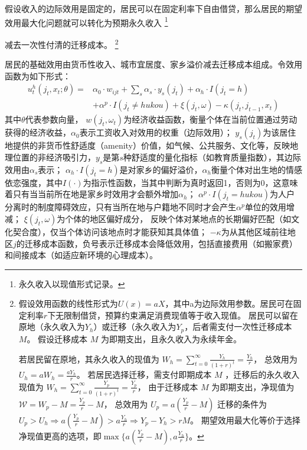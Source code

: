 \documentclass[
  a4paper,
  zihao=-4,
  fontset=mac,
  AutoFakeBold,
  AutoFakeSlant,
  oneside]{ctexbook}
\let\oldfootnote\footnote
\renewcommand{\footnote}[1]{%
  \oldfootnote{\setstretch{1.5}#1}%
}
\begin{document}
假设收入的边际效用是固定的，居民可以在固定利率下自由借贷，那么居民的期望效用最大化问题就可以转化为预期永久收入\footnote{永久收入以现值形式记录。}
减去一次性付清的迁移成本。
\footnote{
假设效用函数的线性形式为$U(x)=a X$，其中a为边际效用参数。居民可在固定利率$r$下无限制借贷，预算约束满足消费现值等于收入现值。
居民可以留在原地（永久收入为$Y_h$）或迁移（永久收入为$Y_p$，后者需支付一次性迁移成本 $M$。
假设迁移成本 
$M$
为即期支出，且永久收入为永续年金。

若居民留在原地，其永久收入的现值为
$W_h = \sum\limits_{t=0}^\infty \frac{Y_h}{(1+r)^t}=\frac{Y_h}{r}$，
总效用为$U_h=a W_h = \frac{a Y_h}{r}$。
若居民选择迁移，需支付即期成本 
$M$
，迁移后的永久收入现值为
$W_h = \sum\limits_{t=0}^\infty \frac{Y_p}{(1+r)^t}=\frac{Y_p}{r}$，
由于迁移成本 
$M$
为即期支出，净现值为
$\mathcal{W}=W_p-M=\frac{Y_p}{r}-M$，
总效用为
$U_p=a(\frac{Y_p}{r}-M)$
迁移的条件为$U_p>U_h \Rightarrow a(\frac{Y_p}{r}-M) > a \frac{ Y_h}{r} \Rightarrow Y_p-Y_h > rM$。
期望效用最大化等价于选择净现值更高的选项，即$\max\{a(\frac{Y_p}{r}-M), a \frac{ Y_h}{r}\}$。
}
居民的基础效用由货币性收入、城市宜居度、家乡溢价减去迁移成本组成。令效用函数为如下形式：
\begin{equation}
  \begin{split}
    u_t^h(j_t,x_t;\theta)=&\alpha_0 \cdot w_{ijt}+\sum\limits_{s} \alpha_{s} \cdot y_{s}(j_t)  + \alpha_h \cdot I(j_t=h) 
    \\& + \alpha^p \cdot I(j_t \neq hukou) +\xi(j_t,\omega)-\kappa(j_t,j_{t-1},x_t)
  \end{split}
  \label{eq:家乡效用函数中的具体构成}
\end{equation}
其中$\theta$代表参数向量， $w(j_t,\omega_t)$为经济收益函数，衡量个体在当前位置通过劳动获得的经济收益，$\alpha_0$表示工资收入对效用的权重（边际效用）；
$y_{s}(j_t)$为该居住地提供的非货币性舒适度（amenity）价值，如气候、公共服务、文化等，反映地理位置的非经济吸引力，$y_s$是第$s$种舒适度的量化指标（如教育质量指数），其边际效用由$\alpha_s$表示；
$\alpha_h \cdot I(j_t=h)$是对家乡的偏好溢价，$\alpha_h$衡量个体对出生地的情感依恋强度，其中$I(\cdot)$为指示性函数，当其中判断为真时返回1，否则为0，这意味着只有当当前所在地是家乡时效用才会额外增加$\alpha_h$；
$\alpha^p \cdot I(j_t = hukou)$为人户分离时的制度障碍效应，只有当所在地与户籍地不同时才会产生$\alpha^p$单位的效用增减；
$\xi(j_t,\omega)$为个体的地区偏好成分，
反映个体对某地点的长期偏好匹配（如文化契合度），仅当个体访问该地点时才能获知其具体值；
$-\kappa$为从其他区域前往地区$j$的迁移成本函数，负号表示迁移成本会降低效用，包括直接费用（如搬家费）和间接成本（如适应新环境的心理成本）。
\end{document}

